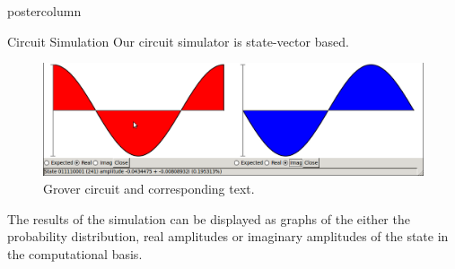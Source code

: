 \documentclass[final]{beamer} %
\begin{document}
\begin{frame}{}
\begin{columns}
        \begin{column}{.33\textwidth}
        \begin{beamercolorbox}[center,wd=\textwidth]{postercolumn}
        \begin{minipage}[c][0.95\textheight][s]{0.95\columnwidth}
            \begin{block}{\large Circuit Simulation}
                Our circuit simulator is state-vector based.
		        \begin{figure}[!htbp]
		            \centering
		            \includegraphics{figures/state.png}
		            \caption{Grover circuit and corresponding text.}
		        \end{figure}
                The results of the simulation can be displayed as graphs of the either the probability distribution, real amplitudes or imaginary amplitudes of the state in the computational basis.
		        \begin{figure}[!htbp]
		            \centering

\end{figure}
\end{block}
\end{minipage}
\end{beamercolorbox}
\end{column}
\end{columns}
\end{frame}
\end{document}
